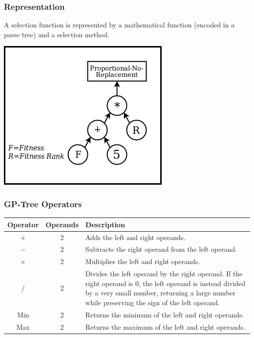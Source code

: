 \documentclass{beamer}
\begin{document}
	\begin{frame}
		\frametitle{Representation}
		A selection function is represented by a mathematical function (encoded in a parse tree) and a selection method.
		\begin{center}
			\includegraphics[height=0.6\textheight]{example_eppsea_nolabel}
		\end{center}
	\end{frame}

	\begin{frame}
	\frametitle{GP-Tree Operators}
	\begin{table}
		\centering
		\label{tab:gp-operators}
		\small
		\begin{tabular}{cc|p{6cm}}
			\hline
			Operator & Operands & Description\\
			\hline
			$+$ & 2 & Adds the left and right operands. \\
			\hline
			$-$ & 2 & Subtracts the right operand from the left operand.\\    
			\hline
			$\times$ & 2 & Multiplies the left and right operands.\\  
			\hline
			$/$ & 2 & Divides the left operand by the right operand. If the right operand is 0, the left operand is instead divided by a very small number, returning a large number while preserving the sign of the left operand.\\      
			\hline
			Min & 2 & Returns the minimum of the left and right operands.\\
			\hline
			Max & 2 & Returns the maximum of the left and right operands.\\  
			
			\hline
		\end{tabular}
	\end{table}
\end{frame}
\end{document}
